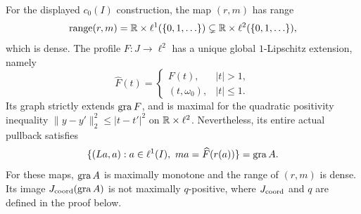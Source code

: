 \begin{corollary}\label{cor:dense-profile}
For the displayed $c_0(I)$ construction, the map $(r,m)$ has range
\begin{equation}
\operatorname{range}(r,m)=\mathbb R\times\ell^1(\{0,1,\ldots\})
\subsetneq\mathbb R\times\ell^2(\{0,1,\ldots\}),
\label{eq:cor-dense-range}
\end{equation}
which is dense. The profile $F:J\to\ell^2$ has a unique global
$1$-Lipschitz extension, namely
\begin{equation}
\widehat F(t)=
\begin{cases}
F(t),&|t|>1,\\
(t,\omega_0),&|t|\le1.
\end{cases}
\label{eq:cor-profile-extension}
\end{equation}
Its graph strictly extends $\operatorname{gra} F$, and is maximal for the quadratic
positivity inequality $\|y-y'\|_2^2\le|t-t'|^2$ on
$\mathbb R\times\ell^2$. Nevertheless, its entire actual pullback satisfies
\begin{equation}
\{(La,a):a\in\ell^1(I),\ ma=\widehat F(r(a))\}
=\operatorname{gra} A.
\label{eq:cor-same-pullback}
\end{equation}
For these maps, $\operatorname{gra} A$ is maximally monotone and the range of $(r,m)$
is dense. Its image $J_{\rm coord}(\operatorname{gra} A)$ is not maximally $q$-positive,
where $J_{\rm coord}$ and $q$ are defined in the proof below.
\end{corollary}
